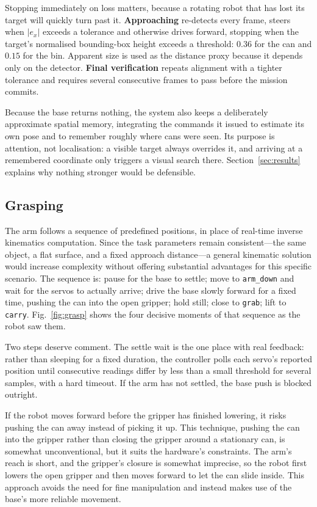 \documentclass[conference,a4paper,10pt]{IEEEtran}
\begin{document}
Stopping immediately on loss matters, because a rotating robot that has
lost its target will quickly turn past it. \textbf{Approaching}
re-detects every frame, steers when $|e_x|$ exceeds a tolerance and
otherwise drives forward, stopping when the target's normalised
bounding-box height exceeds a threshold: $0.36$ for the can and $0.15$
for the bin. Apparent size is used as the distance proxy because it
depends only on the detector. \textbf{Final verification} repeats
alignment with a tighter tolerance and requires several consecutive
frames to pass before the mission commits.

Because the base returns nothing, the system also keeps a deliberately
approximate spatial memory, integrating the commands it issued to
estimate its own pose and to remember roughly where cans were seen. Its
purpose is attention, not localisation: a visible target always overrides
it, and arriving at a remembered coordinate only triggers a visual search
there. Section~\ref{sec:results} explains why nothing stronger would be
defensible.

\subsection{Grasping}

The arm follows a sequence of predefined positions, in place of real-time
inverse kinematics computation. Since the task parameters remain
consistent---the same object, a flat surface, and a fixed approach
distance---a general kinematic solution would increase complexity without
offering substantial advantages for this specific scenario. The sequence
is: pause for the base to settle; move to \texttt{arm\_down} and wait for
the servos to actually arrive; drive the base slowly forward for a fixed
time, pushing the can into the open gripper; hold still; close to
\texttt{grab}; lift to \texttt{carry}. Fig.~\ref{fig:grasp} shows the
four decisive moments of that sequence as the robot saw them.

Two steps deserve comment. The settle wait is the one place with real
feedback: rather than sleeping for a fixed duration, the controller polls
each servo's reported position until consecutive readings differ by less
than a small threshold for several samples, with a hard timeout. If the
arm has not settled, the base push is blocked outright.

If the robot moves forward before the gripper has finished lowering, it
risks pushing the can away instead of picking it up. This technique,
pushing the can into the gripper rather than closing the gripper around a
stationary can, is somewhat unconventional, but it suits the hardware's
constraints. The arm's reach is short, and the gripper's closure is
somewhat imprecise, so the robot first lowers the open gripper and then
moves forward to let the can slide inside. This approach avoids the need
for fine manipulation and instead makes use of the base's more reliable
movement.
\end{document}
